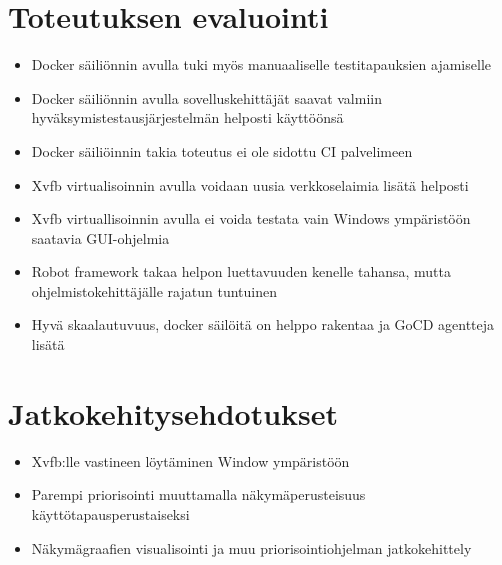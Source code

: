 \section{Toteutuksen evaluointi} \label{ch:12_toteutuksen_evaluointi}

  \begin{itemize}
    \item Docker säiliönnin avulla tuki myös manuaaliselle testitapauksien ajamiselle
    \item Docker säiliönnin avulla sovelluskehittäjät saavat valmiin hyväksymistestausjärjestelmän helposti käyttöönsä
    \item Docker säiliöinnin takia toteutus ei ole sidottu CI palvelimeen
    \item Xvfb virtualisoinnin avulla voidaan uusia verkkoselaimia lisätä helposti
    \item Xvfb virtuallisoinnin avulla ei voida testata vain Windows ympäristöön saatavia GUI-ohjelmia
    \item Robot framework takaa helpon luettavuuden kenelle tahansa, mutta ohjelmistokehittäjälle rajatun tuntuinen
    \item Hyvä skaalautuvuus, docker säilöitä on helppo rakentaa ja GoCD agentteja lisätä
  \end{itemize}

\section{Jatkokehitysehdotukset} \label{ch:12_jatkokehitysehdotukset}

  \begin{itemize}
    \item Xvfb:lle vastineen löytäminen Window ympäristöön
    \item Parempi priorisointi muuttamalla näkymäperusteisuus käyttötapausperustaiseksi
    \item Näkymägraafien visualisointi ja muu priorisointiohjelman jatkokehittely
  \end{itemize}